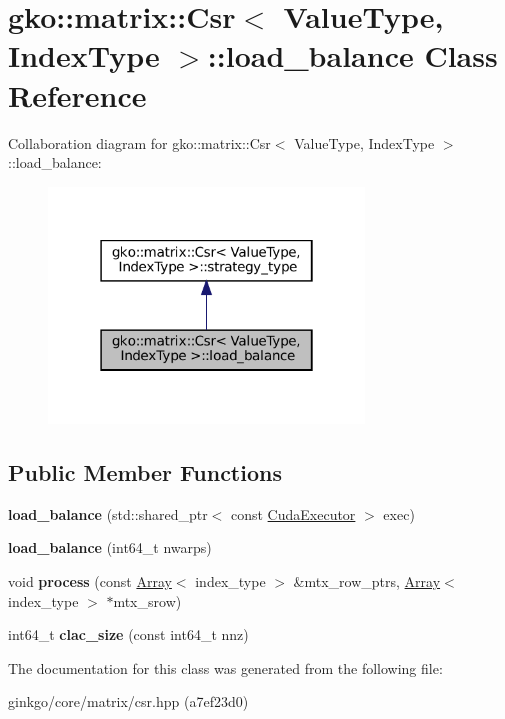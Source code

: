 \hypertarget{classgko_1_1matrix_1_1Csr_1_1load__balance}{}\section{gko\+:\+:matrix\+:\+:Csr$<$ Value\+Type, Index\+Type $>$\+:\+:load\+\_\+balance Class Reference}
\label{classgko_1_1matrix_1_1Csr_1_1load__balance}


Collaboration diagram for gko\+:\+:matrix\+:\+:Csr$<$ Value\+Type, Index\+Type $>$\+:\+:load\+\_\+balance\+:
\nopagebreak
\begin{figure}[H]
\begin{center}
\leavevmode
\includegraphics[width=238pt]{classgko_1_1matrix_1_1Csr_1_1load__balance__coll__graph}
\end{center}
\end{figure}
\subsection*{Public Member Functions}
\begin{DoxyCompactItemize}
\item 
\mbox{\label{classgko_1_1matrix_1_1Csr_1_1load__balance_ad80a0ef5dd9bb2e4f311e59e5e4e013e}} 
{\bfseries load\+\_\+balance} (std\+::shared\+\_\+ptr$<$ const \hyperlink{classgko_1_1CudaExecutor}{Cuda\+Executor} $>$ exec)
\item 
\mbox{\label{classgko_1_1matrix_1_1Csr_1_1load__balance_a851a72f0ac2f8be45982b5aa0b85d15d}} 
{\bfseries load\+\_\+balance} (int64\+\_\+t nwarps)
\item 
\mbox{\label{classgko_1_1matrix_1_1Csr_1_1load__balance_a8219420a14f2d6fc2242897900ce4448}} 
void {\bfseries process} (const \hyperlink{classgko_1_1Array}{Array}$<$ index\+\_\+type $>$ \&mtx\+\_\+row\+\_\+ptrs, \hyperlink{classgko_1_1Array}{Array}$<$ index\+\_\+type $>$ $\ast$mtx\+\_\+srow)
\item 
\mbox{\label{classgko_1_1matrix_1_1Csr_1_1load__balance_aafc499605813d57af41c57744d44e133}} 
int64\+\_\+t {\bfseries clac\+\_\+size} (const int64\+\_\+t nnz)
\end{DoxyCompactItemize}


The documentation for this class was generated from the following file\+:\begin{DoxyCompactItemize}
\item 
ginkgo/core/matrix/csr.\+hpp (a7ef23d0)\end{DoxyCompactItemize}
